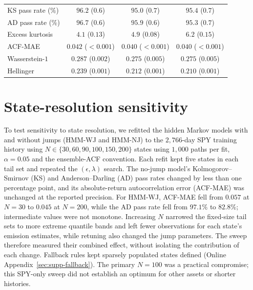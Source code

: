 \begin{table}[H]
\begin{tabular}{@{}lccc@{}}
KS pass rate (\%)   & $\mathbf{96.2}$ ($0.6$) &  $95.0$ ($0.7$)         &  $95.4$ ($0.7$) \\
AD pass rate (\%)   & $\mathbf{96.7}$ ($0.6$) &  $95.9$ ($0.6$)         &  $95.3$ ($0.7$) \\
Excess kurtosis     &   $4.1$ ($0.13$)        &   $4.9$ ($0.08$)        & $\mathbf{6.2}$ ($0.15$) \\
ACF-MAE             & $0.042$ ($<\!0.001$)    & $\mathbf{0.040}$ ($<\!0.001$) & $\mathbf{0.040}$ ($<\!0.001$) \\
Wasserstein-$1$     & $0.287$ ($0.002$)       & $\mathbf{0.275}$ ($0.005$) & $\mathbf{0.275}$ ($0.005$) \\
Hellinger           & $0.239$ ($0.001$)       & $0.212$ ($0.001$)       & $\mathbf{0.210}$ ($0.001$) \\
\bottomrule
\end{tabular}
\end{table}

\section{State-resolution sensitivity}
\label{sec:supp-sensitivity}

To test sensitivity to state resolution, we refitted the hidden
Markov models with and without jumps (HMM-WJ and HMM-NJ) to the
$2{,}766$-day SPY training history using
$N\in\{30,60,90,100,150,200\}$ states
using $1{,}000$ paths per fit, $\alpha=0.05$ and the ensemble-ACF convention. Each refit kept five states in each
tail set and repeated the $(\epsilon,\lambda)$ search. The no-jump model's
Kolmogorov--Smirnov (KS) and Anderson--Darling (AD) pass rates changed
by less than one percentage point, and its absolute-return
autocorrelation error (ACF-MAE) was unchanged at the reported
precision. For HMM-WJ, ACF-MAE fell from $0.057$ at $N=30$ to
$0.045$ at $N=200$, while the AD pass rate fell from $97.1\%$ to
$82.8\%$; intermediate values were not monotone. Increasing $N$
narrowed the fixed-size tail sets to more extreme quantile bands and
left fewer observations for each state's emission estimates, while
retuning also changed the jump parameters. The sweep therefore
measured their combined effect, without isolating the contribution of
each change. Fallback rules kept sparsely populated states defined
(Online Appendix~\ref{sec:supp-fallback}). The primary $N=100$ was a practical compromise; this SPY-only sweep did not establish an optimum for other assets or shorter histories.

